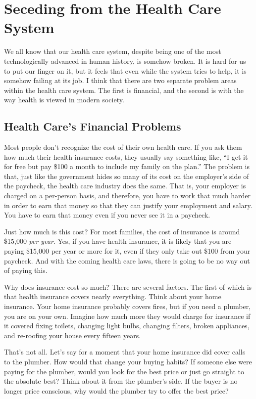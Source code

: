 \chapter{Seceding from the Health Care System}

We all know that our health care system, despite being one of the most
technologically advanced in human history, is somehow broken. It is
hard for us to put our finger on it, but it feels that even while
the system tries to
help, it is somehow failing at its job. I think that there are two
separate problem areas within the health care system. The first is
financial, and the second is with the way health is viewed in modern
society.

\section{Health Care’s Financial Problems}

Most people don’t recognize the cost of their own health care. If you
ask them how much their health insurance costs, they usually say
something like, “I get it for free but pay \$100 a month to include my
family on the plan.”  The problem is that, just like the government
hides so many of its cost on the employer’s side of the paycheck, the
health care industry does the same. That is, your employer is charged
on a per-person basis, and therefore, you have to work that much harder
in order to earn that money
so that they can
justify your employment and salary. You have to earn that money even if
you never see it in a paycheck.

Just how much is this cost?  For most families, the cost of insurance is
around \$15,000 \textit{per year}. Yes, if you have health insurance,
it is likely that you are paying \$15,000 per year or more for it, even
if they only take out \$100 from your paycheck. And with the coming
health care laws, there is going to be no way out of paying this.

Why does insurance cost so much?  There are several
factors. The first of
which is that health insurance covers nearly everything. Think about
your home insurance. Your home insurance probably covers fires, but if
you need a plumber, you are on your own. Imagine how much more they
would charge for
insurance if it covered fixing toilets, changing light bulbs, changing
filters, broken appliances, and re-roofing your house every fifteen
years. 

That’s not all. Let’s say for a moment that your home insurance did
cover calls to the plumber. How would that change your buying habits? 
If someone else were paying for the plumber, would you look for the
best price or just go straight to the absolute best?  Think about it
from the plumber’s side. If the buyer is no longer price conscious, why
would the plumber try to offer the best price? 

